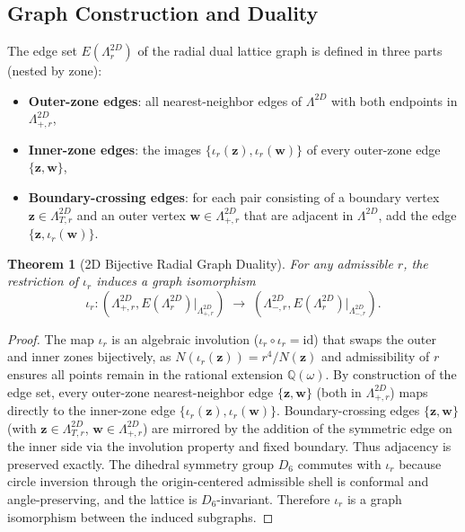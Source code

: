\documentclass{article}
\newtheorem{theorem}{Theorem}
\begin{document}
\subsection{Graph Construction and Duality}
The edge set \(E(\Lambda_r^{2D})\) of the radial dual lattice graph is defined in three parts (nested by zone):
\begin{itemize}
  \item \textbf{Outer-zone edges}: all nearest-neighbor edges of \(\Lambda^{2D}\) with both endpoints in \(\Lambda_{+,r}^{2D}\),
  \item \textbf{Inner-zone edges}: the images \(\{\iota_r(\mathbf{z}), \iota_r(\mathbf{w})\}\) of every outer-zone edge \(\{\mathbf{z}, \mathbf{w}\}\),
  \item \textbf{Boundary-crossing edges}: for each pair consisting of a boundary vertex \(\mathbf{z} \in \Lambda_{T,r}^{2D}\) and an outer vertex \(\mathbf{w} \in \Lambda_{+,r}^{2D}\) that are adjacent in \(\Lambda^{2D}\), add the edge \(\{\mathbf{z}, \iota_r(\mathbf{w})\}\).
\end{itemize}
\begin{theorem}[2D Bijective Radial Graph Duality]
For any admissible \(r\), the restriction of \(\iota_r\) induces a graph isomorphism
\[
\iota_r \colon (\Lambda_{+,r}^{2D}, E(\Lambda_r^{2D})|_{\Lambda_{+,r}^{2D}}) \;\to\; (\Lambda_{-,r}^{2D}, E(\Lambda_r^{2D})|_{\Lambda_{-,r}^{2D}}).
\]
\end{theorem}
\begin{proof}
The map \(\iota_r\) is an algebraic involution (\(\iota_r \circ \iota_r = \mathrm{id}\)) that swaps the outer and inner zones bijectively, as \(N(\iota_r(\mathbf{z})) = r^4 / N(\mathbf{z})\) and admissibility of \(r\) ensures all points remain in the rational extension \(\mathbb{Q}(\omega)\). By construction of the edge set, every outer-zone nearest-neighbor edge \(\{\mathbf{z}, \mathbf{w}\}\) (both in \(\Lambda_{+,r}^{2D}\)) maps directly to the inner-zone edge \(\{\iota_r(\mathbf{z}), \iota_r(\mathbf{w})\}\). Boundary-crossing edges \(\{\mathbf{z}, \mathbf{w}\}\) (with \(\mathbf{z} \in \Lambda_{T,r}^{2D}\), \(\mathbf{w} \in \Lambda_{+,r}^{2D}\)) are mirrored by the addition of the symmetric edge on the inner side via the involution property and fixed boundary. Thus adjacency is preserved exactly. The dihedral symmetry group \(D_6\) commutes with \(\iota_r\) because circle inversion through the origin-centered admissible shell is conformal and angle-preserving, and the lattice is \(D_6\)-invariant. Therefore \(\iota_r\) is a graph isomorphism between the induced subgraphs.
\end{proof}
\end{document}
